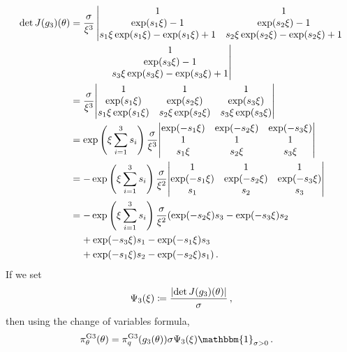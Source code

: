 \documentclass{article}
\DeclarePairedDelimiter\abs{\lvert}{\rvert}
\begin{document}
\begin{align*}
	\det J(g_3)(\theta)
		&= \frac{\sigma}{\xi ^ {3}} \left\vert
		\begin{matrix}
			1 &1\\
			\exp(s_1 \xi)-1 &\exp(s_2 \xi)-1\\
			s_1 \xi \exp(s_1 \xi) - \exp(s_1 \xi) + 1
				&s_2 \xi \exp(s_2 \xi) - \exp(s_2 \xi) + 1
		\end{matrix}
	\right.\\
	&\qquad \qquad \left.
		\begin{matrix}
			1\\
			\exp(s_3 \xi) - 1\\
			s_3 \xi \exp(s_3 \xi) -\exp(s_3 \xi) + 1
		\end{matrix}
	\right\vert\\
	&= \frac{\sigma}{\xi ^ {3}} \abs*{
		\begin{matrix}
			1 &1 &1\\
			\exp(s_1 \xi) &\exp(s_2 \xi) &\exp(s_3 \xi)\\
			s_1 \xi \exp(s_1 \xi)
				&s_2 \xi \exp(s_2 \xi)
				&s_3 \xi \exp(s_3 \xi)
		\end{matrix} }\\	
	&= \exp\left(\xi\sum_{i = 1}^3 s_i\right) \frac{\sigma}{\xi ^ {3}}
		\abs*{
			\begin{matrix}
				\exp(-s_1 \xi) &\exp(-s_2 \xi) &\exp(-s_3 \xi)\\
				1 &1 &1 \\
				s_1 \xi 
					&s_2 \xi
					&s_3 \xi
			\end{matrix} } \\
	&= -\exp\left(\xi\sum_{i = 1}^3 s_i\right) \frac{\sigma}{\xi ^ 2}
		\abs*{
			\begin{matrix}
				1 &1 &1 \\
				\exp(-s_1 \xi) &\exp(-s_2 \xi) &\exp(-s_3 \xi) \\
				s_1 &s_2 &s_3
			\end{matrix} } \\
	&= -\exp\left(\xi\sum_{i = 1}^3 s_i\right) \frac{\sigma}{\xi ^ 2}
		(\exp(-s_2 \xi) s_3 - \exp(-s_3 \xi) s_2 \\
	&\ \phantom{=}
		+ \exp(-s_3 \xi) s_1 - \exp(-s_1 \xi) s_3 \\
	&\ \phantom{=}
		+ \exp(-s_1 \xi) s_2 - \exp(-s_2 \xi) s_1) \,.
\end{align*}
%
If we set
\begin{align}
	\Psi_3(\xi) \coloneqq \frac{\abs{\det J(g_3)(\theta)}}{\sigma} \,,
	\label{eq:psi-3}
\end{align}
%
then using the change of variables formula,
%
\begin{align}
	\pi^{\text{G3}}_\theta(\theta)
		&= \pi^{\text{G3}}_q(g_3(\theta)) \sigma \Psi_3(\xi)
		\mathbbm{1}_{\sigma>0} \,.
	\label{eq:change-of-variables-2}
\end{align}
%
\end{document}
